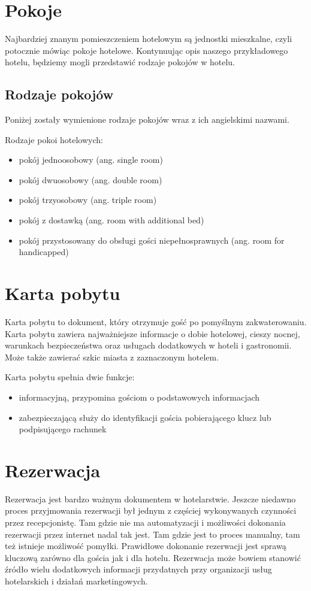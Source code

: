 \documentclass[a4paper,onecolumn,oneside,11pt,wide,floatssmall]{mwrep}
\theoremstyle{definition}
\theoremstyle{plain}%
\theoremstyle{remark}
\begin{document}
\section{Pokoje}
Najbardziej znanym pomieszczeniem hotelowym są jednostki mieszkalne, czyli 
potocznie mówiąc pokoje hotelowe. Kontynuując opis naszego przykładowego 
hotelu, będziemy mogli przedstawić rodzaje pokojów w hotelu.

\subsection{Rodzaje pokojów}
Poniżej zostały wymienione rodzaje pokojów wraz z ich angielskimi nazwami.

Rodzaje pokoi hotelowych:
\begin{itemize}
  \item pokój jednoosobowy (ang. single room)
  \item pokój dwuosobowy (ang. double room)
  \item pokój trzyosobowy (ang. triple room)
  \item pokój z dostawką (ang. room with additional bed)
  \item pokój przystosowany do obsługi gości niepełnosprawnych (ang. room for 
  handicapped)
\end{itemize}

\section{Karta pobytu}
Karta pobytu to dokument, który otrzymuje gość po pomyślnym zakwaterowaniu. 
Karta pobytu zawiera najważniejsze informacje o dobie hotelowej, cieszy 
nocnej, warunkach bezpieczeństwa oraz usługach dodatkowych w hoteli i 
gastronomii. Może także zawierać szkic miasta z zaznaczonym hotelem.

Karta pobytu spełnia dwie funkcje:
\begin{itemize}
  \item{informacyjną}, przypomina gościom o podstawowych informacjach
  \item{zabezpieczającą} służy do identyfikacji gościa pobierającego klucz 
  lub podpisującego rachunek
\end{itemize}

\section{Rezerwacja}
Rezerwacja jest bardzo ważnym dokumentem w hotelarstwie. Jeszcze niedawno 
proces przyjmowania rezerwacji był jednym z częściej wykonywanych czynności 
przez recepcjonistę. Tam gdzie nie ma automatyzacji i możliwości dokonania 
rezerwacji przez internet nadal tak jest. Tam gdzie jest to proces manualny, 
tam też istnieje możliwość pomyłki. Prawidłowe dokonanie rezerwacji jest 
sprawą kluczową zarówno dla gościa jak i dla hotelu. Rezerwacja może bowiem 
stanowić źródło wielu dodatkowych informacji przydatnych przy organizacji 
usług hotelarskich i działań marketingowych.
\end{document}
